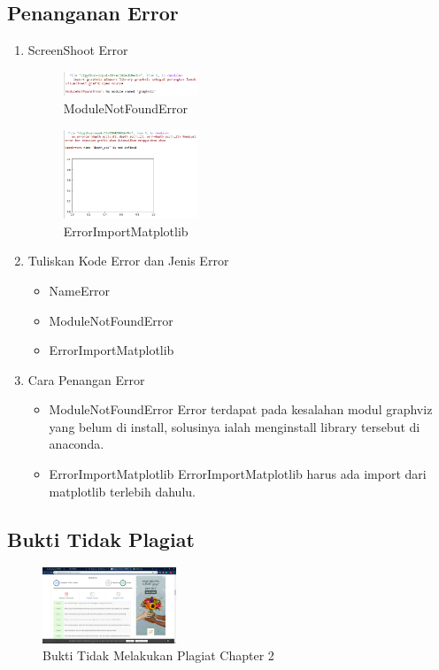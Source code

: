 \subsection{Penanganan Error}
\begin{enumerate}
	\item ScreenShoot Error
	\begin{figure}[H]
		\includegraphics[width=4cm]{figures/1174002/2/notmoduleerror.PNG}
		\centering
		\caption{ModuleNotFoundError}
	\end{figure}
	\begin{figure}[H]
		\includegraphics[width=4cm]{figures/1174002/2/errorimportmatplotlib.PNG}
		\centering
		\caption{ErrorImportMatplotlib}
	\end{figure}
	\item Tuliskan Kode Error dan Jenis Error
	\begin{itemize}
		\item NameError
		\item ModuleNotFoundError
		\item ErrorImportMatplotlib
	\end{itemize}

	\item Cara Penangan Error
	\begin{itemize}
		\item ModuleNotFoundError
		\hfill\break
		Error terdapat pada kesalahan modul graphviz yang belum di install, solusinya ialah menginstall library tersebut di anaconda.
		\item ErrorImportMatplotlib
		\hfill\break
		ErrorImportMatplotlib harus ada import dari matplotlib terlebih dahulu.
	\end{itemize}
\end{enumerate}

\subsection{Bukti Tidak Plagiat}
\begin{figure}[H]
\centering
	\includegraphics[width=4cm]{figures/1174002/2/plagiat.PNG}
	\caption{Bukti Tidak Melakukan Plagiat Chapter 2}
\end{figure}